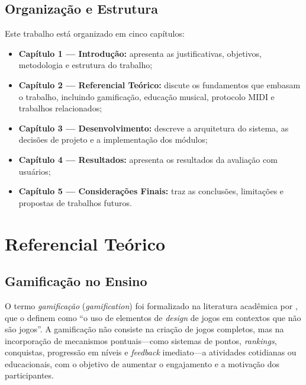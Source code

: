 \documentclass[
  12pt,
  openright,
  twoside,
  a4paper,
  english,
  brazil
]{abntex2}
\begin{document}
\section{Organização e Estrutura}

Este trabalho está organizado em cinco capítulos:

\begin{itemize}
  \item \textbf{Capítulo 1 --- Introdução:} apresenta as justificativas,
        objetivos, metodologia e estrutura do trabalho;
  \item \textbf{Capítulo 2 --- Referencial Teórico:} discute os
        fundamentos que embasam o trabalho, incluindo gamificação,
        educação musical, protocolo MIDI e trabalhos relacionados;
  \item \textbf{Capítulo 3 --- Desenvolvimento:} descreve a arquitetura
        do sistema, as decisões de projeto e a implementação dos módulos;
  \item \textbf{Capítulo 4 --- Resultados:} apresenta os resultados da
        avaliação com usuários;
  \item \textbf{Capítulo 5 --- Considerações Finais:} traz as conclusões,
        limitações e propostas de trabalhos futuros.
\end{itemize}

\chapter{Referencial Teórico}

\section{Gamificação no Ensino}

O termo \textit{gamificação} (\textit{gamification}) foi formalizado na
literatura acadêmica por \textcite{deterding2011}, que o definem como
``o uso de elementos de \textit{design} de jogos em contextos que não
são jogos''. A gamificação não consiste na criação de jogos completos,
mas na incorporação de mecanismos pontuais---como sistemas de pontos,
\textit{rankings}, conquistas, progressão em níveis e
\textit{feedback} imediato---a atividades cotidianas ou educacionais,
com o objetivo de aumentar o engajamento e a motivação dos participantes.
\end{document}
